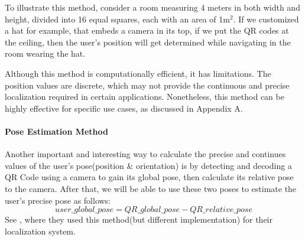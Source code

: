 To illustrate this method, consider a room measuring 4 meters in both width and height, divided into 16 equal squares, each with an area of 1m$^2$. If we customized a hat for example, that embeds a camera in its top, if we put the QR codes at the ceiling, then the user’s position will get determined while navigating in the room wearing the hat.

Although this method is computationally efficient, it has limitations. The position values are discrete, which may not provide the continuous and precise localization required in certain applications. Nonetheless, this method can be highly effective for specific use cases, as discussed in Appendix A.


\paragraph{Pose Estimation Method}
\label{Pose Estimation with QR Codes BG}
Another important and interesting way to calculate the precise and continues values of the user’s pose(position \& orientation) is by detecting and decoding a QR Code using a camera to gain its global pose, then calculate its relative pose to the camera. After that, we will be able to use these two poses to estimate the user’s precise pose as follows:
\[ user\_global\_pose = QR\_global\_pose - QR\_relative\_pose\]
See \cite{Lucag2017}, where they used this method(but different implementation) for their localization system.

